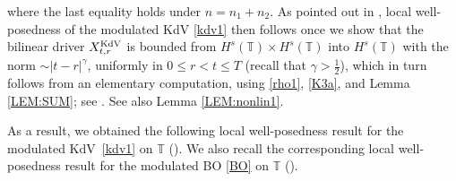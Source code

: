 \documentclass[letterpaper, 11pt,  reqno]{amsart}
\newcommand{\1}{\hspace{0.5mm}\text{I}\hspace{0.5mm}}
\newcommand{\noi}{\noindent}
\newcommand{\T}{\mathbb{T}}
\newcommand{\g}{\gamma}
\newcommand{\KDV}{\text{\rm KdV} }
\numberwithin{equation}{section}
\numberwithin{theorem}{section}
\begin{document}
\noi
where the last equality holds under  $n = n_1+ n_2$.
As pointed out in \cite[Section 3]{CGLLO1}, 
local well-posedness of the modulated KdV \eqref{kdv1}
then follows 
once we show that 
the bilinear driver $X^\KDV_{t, r}$ is 
bounded from $H^s(\T) \times
H^s(\T)$ into $H^s(\T)$
with the norm $\sim |t- r|^\g$, 
uniformly in  $0 \le r < t \le T$
(recall that $\g > \frac 12$), 
which in turn follows from 
an elementary computation, 
using \eqref{rho1}, \eqref{K3a}, 
and 
 Lemma \ref{LEM:SUM};
 see
 \cite[Proposition~4.1]{CGLLO1}.
See also Lemma \ref{LEM:nonlin1}.



As a result, we obtained
the following local well-posedness result
for  the modulated KdV~\eqref{kdv1} on $\T$
(\cite[Theorem 1.3\,(i)]{CGLLO1}). 
We also recall the corresponding 
local well-posedness result
for the modulated BO \eqref{BO} on $\T$
(\cite[Theorem 1.11\,(i)]{CGLLO1}). 
\end{document}
